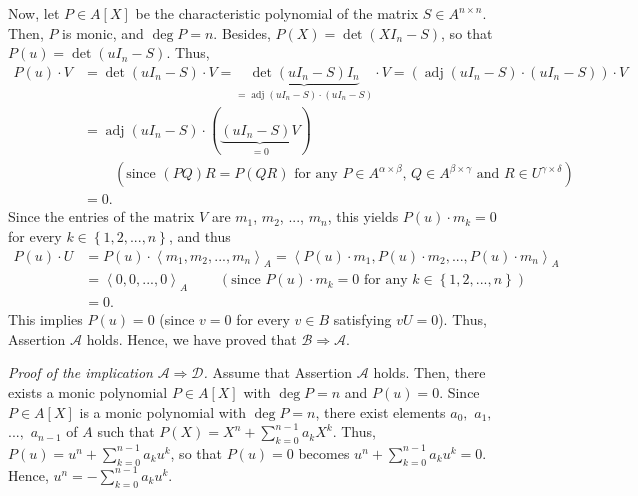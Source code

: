\documentclass[12pt,final,notitlepage,onecolumn]{article}%
\begin{document}
Now, let $P\in A\left[  X\right]  $ be the characteristic polynomial of the
matrix $S\in A^{n\times n}$. Then, $P$ is monic, and $\deg P=n$. Besides,
$P\left(  X\right)  =\det\left(  XI_{n}-S\right)  $, so that $P\left(
u\right)  =\det\left(  uI_{n}-S\right)  $. Thus,%
\begin{align*}
P\left(  u\right)  \cdot V  &  =\det\left(  uI_{n}-S\right)  \cdot
V=\underbrace{\det\left(  uI_{n}-S\right)  I_{n}}_{=\operatorname{adj}\left(
uI_{n}-S\right)  \cdot\left(  uI_{n}-S\right)  }\cdot V=\left(
\operatorname{adj}\left(  uI_{n}-S\right)  \cdot\left(  uI_{n}-S\right)
\right)  \cdot V\\
&  =\operatorname{adj}\left(  uI_{n}-S\right)  \cdot\left(
\underbrace{\left(  uI_{n}-S\right)  V}_{=0}\right) \\
&  \ \ \ \ \ \ \ \ \ \ \left(  \text{since }\left(  PQ\right)  R=P\left(
QR\right)  \text{ for any }P\in A^{\alpha\times\beta}\text{, }Q\in
A^{\beta\times\gamma}\text{ and }R\in U^{\gamma\times\delta}\right) \\
&  =0.
\end{align*}
Since the entries of the matrix $V$ are $m_{1}$, $m_{2}$, $...$, $m_{n}$, this
yields $P\left(  u\right)  \cdot m_{k}=0$ for every $k\in\left\{
1,2,...,n\right\}  $, and thus%
\begin{align*}
P\left(  u\right)  \cdot U  &  =P\left(  u\right)  \cdot\left\langle
m_{1},m_{2},...,m_{n}\right\rangle _{A}=\left\langle P\left(  u\right)  \cdot
m_{1},P\left(  u\right)  \cdot m_{2},...,P\left(  u\right)  \cdot
m_{n}\right\rangle _{A}\\
&  =\left\langle 0,0,...,0\right\rangle _{A}\ \ \ \ \ \ \ \ \ \ \left(
\text{since }P\left(  u\right)  \cdot m_{k}=0\text{ for any }k\in\left\{
1,2,...,n\right\}  \right) \\
&  =0.
\end{align*}
This implies $P\left(  u\right)  =0$ (since $v=0$ for every $v\in B$
satisfying $vU=0$). Thus, Assertion $\mathcal{A}$ holds. Hence, we have proved
that $\mathcal{B}\Longrightarrow\mathcal{A}$.

\textit{Proof of the implication }$\mathcal{A}\Longrightarrow\mathcal{D}%
$\textit{.} Assume that Assertion $\mathcal{A}$ holds. Then, there exists a
monic polynomial $P\in A\left[  X\right]  $ with $\deg P=n$ and $P\left(
u\right)  =0$. Since $P\in A\left[  X\right]  $ is a monic polynomial with
$\deg P=n$, there exist elements $a_{0},$ $a_{1},$ $...,$ $a_{n-1}$ of $A$
such that $P\left(  X\right)  =X^{n}+\sum\limits_{k=0}^{n-1}a_{k}X^{k}$. Thus,
$P\left(  u\right)  =u^{n}+\sum\limits_{k=0}^{n-1}a_{k}u^{k}$, so that
$P\left(  u\right)  =0$ becomes $u^{n}+\sum\limits_{k=0}^{n-1}a_{k}u^{k}=0$.
Hence, $u^{n}=-\sum\limits_{k=0}^{n-1}a_{k}u^{k}$.
\end{document}
